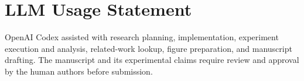 \documentclass[10pt,twocolumn,letterpaper]{article}
\begin{document}
\section*{LLM Usage Statement}
OpenAI Codex assisted with research planning, implementation, experiment execution and analysis, related-work lookup, figure preparation, and manuscript drafting. The manuscript and its experimental claims require review and approval by the human authors before submission.
\end{document}
